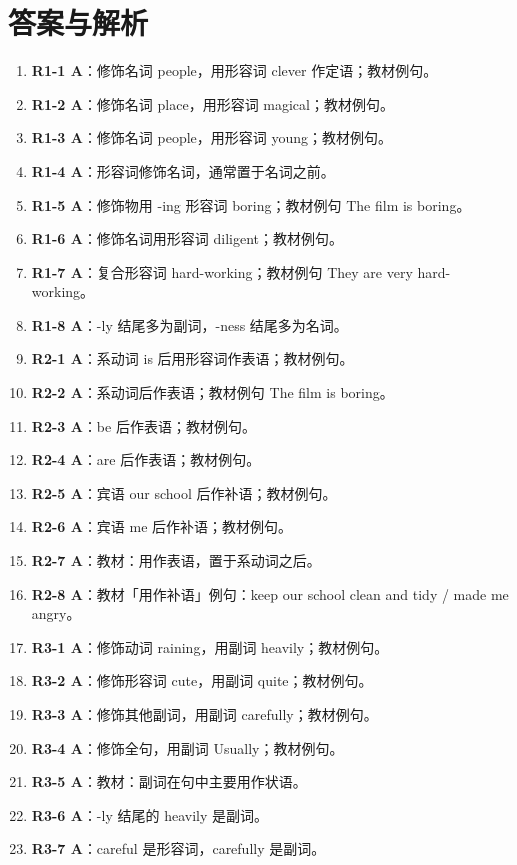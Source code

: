 \documentclass[11pt,a4paper]{ctexart}
\begin{document}
\section*{答案与解析}
\small
\begin{enumerate}[leftmargin=1.6em,itemsep=2pt]
\item \textbf{R1-1 A}：修饰名词 people，用形容词 clever 作定语；教材例句。
\item \textbf{R1-2 A}：修饰名词 place，用形容词 magical；教材例句。
\item \textbf{R1-3 A}：修饰名词 people，用形容词 young；教材例句。
\item \textbf{R1-4 A}：形容词修饰名词，通常置于名词之前。
\item \textbf{R1-5 A}：修饰物用 -ing 形容词 boring；教材例句 The film is boring。
\item \textbf{R1-6 A}：修饰名词用形容词 diligent；教材例句。
\item \textbf{R1-7 A}：复合形容词 hard-working；教材例句 They are very hard-working。
\item \textbf{R1-8 A}：-ly 结尾多为副词，-ness 结尾多为名词。
\item \textbf{R2-1 A}：系动词 is 后用形容词作表语；教材例句。
\item \textbf{R2-2 A}：系动词后作表语；教材例句 The film is boring。
\item \textbf{R2-3 A}：be 后作表语；教材例句。
\item \textbf{R2-4 A}：are 后作表语；教材例句。
\item \textbf{R2-5 A}：宾语 our school 后作补语；教材例句。
\item \textbf{R2-6 A}：宾语 me 后作补语；教材例句。
\item \textbf{R2-7 A}：教材：用作表语，置于系动词之后。
\item \textbf{R2-8 A}：教材「用作补语」例句：keep our school clean and tidy / made me angry。
\item \textbf{R3-1 A}：修饰动词 raining，用副词 heavily；教材例句。
\item \textbf{R3-2 A}：修饰形容词 cute，用副词 quite；教材例句。
\item \textbf{R3-3 A}：修饰其他副词，用副词 carefully；教材例句。
\item \textbf{R3-4 A}：修饰全句，用副词 Usually；教材例句。
\item \textbf{R3-5 A}：教材：副词在句中主要用作状语。
\item \textbf{R3-6 A}：-ly 结尾的 heavily 是副词。
\item \textbf{R3-7 A}：careful 是形容词，carefully 是副词。

\end{enumerate}
\end{document}
